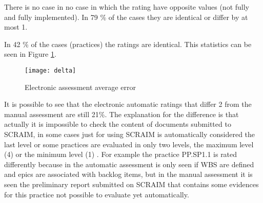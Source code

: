 There is no case in no case in which the rating have opposite values (not fully and fully implemented). In 79 \% of the cases they are identical or differ by at most 1.

In 42 \% of the cases (practices) the ratings are identical. This statistics can be seen in Figure \ref{fig:errorresults}.

\begin{figure}[H]
	\begin{center}
		\leavevmode
		\texttt{[image: delta]}
		\caption{Electronic assessment average error}
		\label{fig:errorresults}
	\end{center}
\end{figure}

It is possible to see that the electronic automatic ratings that differ 2 from the manual assessment are still 21\%. The explanation for the difference is that actually it is impossible to check the content of documents submitted to SCRAIM, in some cases just for using SCRAIM is automatically considered the last level or some practices are evaluated in only two levels, the maximum level (4)  or the minimum level (1) . For example the practice PP.SP1.1 is rated differently because in the automatic assessment is only seen if WBS are defined and epics are associated with backlog items, but in the manual assessment it is seen the preliminary report submitted on SCRAIM that contains some evidences for this practice not possible to evaluate yet automatically.

%
